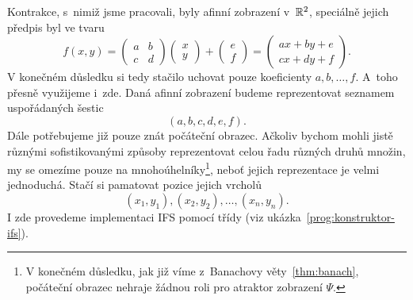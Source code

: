 Kontrakce, s~nimiž jsme pracovali, byly afinní zobrazení v~$\mathbb{R}^2$, speciálně jejich předpis byl ve tvaru
\begin{equation}\label{eq:afinni-zobrazeni}
    f(x,y)=\left(\begin{matrix}
        a & b\\
        c & d
    \end{matrix}\right)\left(\begin{matrix}
        x\\
        y
    \end{matrix}\right)+\left(\begin{matrix}
        e\\
        f
    \end{matrix}\right)=\left(\begin{matrix}
        ax+by+e\\
        cx+dy+f
    \end{matrix}\right).
\end{equation}
V konečném důsledku si tedy stačilo uchovat pouze koeficienty $a,b,\ldots,f$. A~toho přesně využijeme i~zde. Daná afinní zobrazení budeme reprezentovat seznamem uspořádaných šestic
\[(a,b,c,d,e,f).\]
Dále potřebujeme již pouze znát počáteční obrazec. Ačkoliv bychom mohli jistě různými sofistikovanými způsoby reprezentovat celou řadu různých druhů množin, my se omezíme pouze na mnohoúhelníky\footnote{V konečném důsledku, jak již víme z~Banachovy věty~\ref{thm:banach}, počáteční obrazec nehraje žádnou roli pro atraktor zobrazení $\Psi$.}, neboť jejich reprezentace je velmi jednoduchá. Stačí si pamatovat pozice jejich vrcholů
\[(x_1,y_1),(x_2,y_2),\ldots,(x_n,y_n).\]
I zde provedeme implementaci IFS pomocí třídy (viz ukázka~\ref{prog:konstruktor-ifs}).
